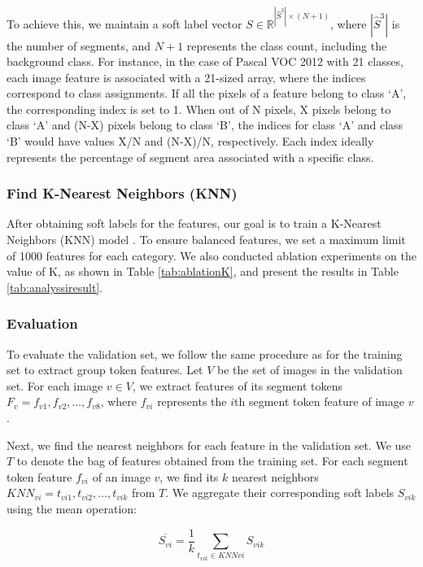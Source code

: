 To achieve this, we maintain a soft label vector $S \in \mathbb{R}^{|\hat{S}^3| \times (N+1)}$, where $|\hat{S}^3|$ is the number of segments, and $N+1$ represents the class count, including the background class. For instance, in the case of Pascal VOC 2012 with 21 classes, each image feature is associated with a 21-sized array, where the indices correspond to class assignments. If all the pixels of a feature  belong to class `A', the corresponding index is set to 1. When out of N pixels, X pixels belong to class `A' and (N-X) pixels belong to class `B', the indices for class `A' and class `B' would have values X/N and (N-X)/N, respectively. Each index ideally represents the percentage of segment area associated with a specific class.

\subsubsection{Find K-Nearest Neighbors (KNN)} 
After obtaining soft labels for the features, our goal is to train a K-Nearest Neighbors (KNN) model \cite{cover1967nearest}. To ensure balanced features, we set a maximum limit of 1000 features for each category. We also conducted ablation experiments on the value of K, as shown in Table \ref{tab:ablationK}, and present the results in Table \ref{tab:analyssiresult}.

\subsubsection{Evaluation}
To evaluate the validation set, we follow the same procedure as for the training set to extract group token features. Let $V$ be the set of images in the validation set. For each image $v \in V$, we extract features of its segment tokens $F_v = {f_{v1}, f_{v2}, \ldots, f_{v8}}$, where $f_{vi}$ represents the $i$th segment token feature of image $v$.

Next, we find the nearest neighbors for each feature in the validation set. We use $T$ to denote the bag of features obtained from the training set. For each segment token feature $f_{vi}$ of an image $v$, we find its $k$ nearest neighbors $KNN_{vi} = {t_{vi1}, t_{vi2}, \ldots, t_{vik}}$ from $T$. We aggregate their corresponding soft labels $S_{vik}$ using the mean operation:

\begin{equation}
\label{eq:analysisaggre}
\overline{S_{vi}} = \frac{1}{k} \sum_{t_{vik} \in {KNN}{vi}} S_{vik}
\end{equation}


